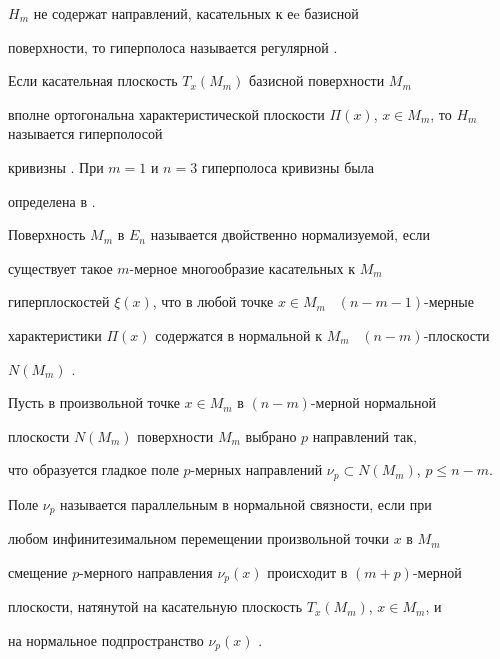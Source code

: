 $H_m$ не содержат направлений, касательных к еe базисной


поверхности, то гиперполоса называется регулярной \cite{chak2}.





Если касательная плоскость $T_x(M_m)$ базисной поверхности $M_m$


вполне ортогональна характеристической плоскости $\Pi


(x)$, $x\in M_m$, то $H_m$ называется гиперполосой


кривизны \cite{chak3}. При $m=1$ и $n=3$ гиперполоса кривизны была


определена в \cite{chak1}.





\begin{defn}


Поверхность $M_m$ в $E_n$ называется двойственно нормализуемой, если 


существует такое $m$-мерное многообразие касательных к $M_m$ 


гиперплоскостей $\xi(x)$, что в любой точке $x\in M_m$ \ $(n-m-1)$-мерные


характеристики $\Pi (x)$ содержатся в нормальной к $M_m$ \ $(n-m)$-плоскости


$N(M_m)$ \cite{chak4}.


\end{defn}





Пусть в произвольной точке $x\in M_m$ в $(n-m)$-мерной нормальной


плоскости $N(M_m)$ поверхности $M_m$ выбрано $p$ направлений так,


что образуется гладкое поле $p$-мерных направлений $\nu_p\subset


N(M_{m})$, $p\leqslant n-m$.





\begin{defn}


Поле $\nu_p$ называется параллельным в нормальной связности, если при 


любом инфинитезимальном перемещении произвольной точки $x$ в $M_m$ 


смещение $p$-мерного направления $\nu_p(x)$ происходит в $(m+p)$-мерной 


плоскости, натянутой на касательную плоскость $T_x(M_m)$, $x\in M_m$, и 


на нормальное подпространство $\nu_p(x)$ \cite{chak4}.


\end{defn}





